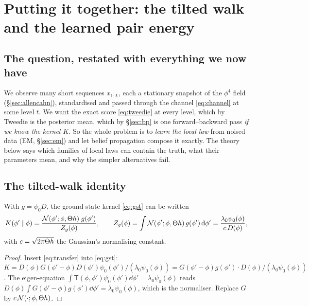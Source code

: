 \section{Putting it together: the tilted walk and the learned pair energy}\label{sec:synthesis}

\subsection{The question, restated with everything we now have}

We observe many short sequences $x_{1:L}$, each a stationary snapshot of the $\phi^4$ field (\S\ref{sec:allencahn}),
standardised and passed through the channel \eqref{eq:channel} at some level $t$. We want the exact score
\eqref{eq:tweedie} at every level, which by Tweedie is the posterior mean, which by \S\ref{sec:bp} is one
forward--backward pass \emph{if we know the kernel $K$}. So the whole problem is to \emph{learn the local law}
from noised data (EM, \S\ref{sec:em}) and let belief propagation compose it exactly. The theory below says which
families of local laws can contain the truth, what their parameters mean, and why the simpler alternatives fail.

\subsection{The tilted-walk identity}

\begin{proposition}\label{prop:tilt}
With $g=\psi_0D$, the ground-state kernel \eqref{eq:gst} can be written
\begin{equation}\label{eq:tiltedwalk}
  K(\phi'\mid\phi)=\frac{\mathcal{N}(\phi';\phi,\Theta h)\;g(\phi')}{Z_g(\phi)},\qquad Z_g(\phi)=\int\mathcal{N}(\phi';\phi,\Theta h)\,g(\phi')\,\mathrm{d}\phi'=\frac{\lambda_0\psi_0(\phi)}{c\,D(\phi)},
\end{equation}
with $c=\sqrt{2\pi\Theta h}$ the Gaussian's normalising constant.
\end{proposition}
\begin{proof}
Insert \eqref{eq:transfer} into \eqref{eq:gst}: $K=D(\phi)G(\phi'-\phi)D(\phi')\psi_0(\phi')/(\lambda_0\psi_0(\phi))=G(\phi'-\phi)g(\phi')\cdot D(\phi)/(\lambda_0\psi_0(\phi))$. The
eigen-equation $\int\mathsf T(\phi,\phi')\psi_0(\phi')\dd\phi'=\lambda_0\psi_0(\phi)$ reads $D(\phi)\int G(\phi'-\phi)g(\phi')\dd\phi'=\lambda_0\psi_0(\phi)$, which is the
normaliser. Replace $G$ by $c\,\mathcal{N}(\cdot;\phi,\Theta h)$.
\end{proof}

